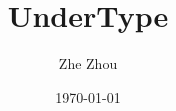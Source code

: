 \documentclass{beamer}
\title{UnderType}
\author{Zhe Zhou}
\date{\today}
\begin{document}
\frame{\titlepage}

% 

\end{document}

